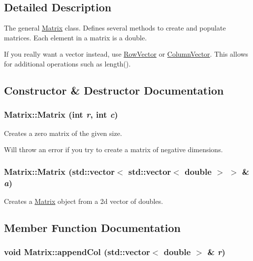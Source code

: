 \subsection{Detailed Description}
The general \hyperlink{class_matrix}{Matrix} class. Defines several methods to create and populate matrices. Each element in a matrix is a double.

If you really want a vector instead, use \hyperlink{class_row_vector}{RowVector} or \hyperlink{class_column_vector}{ColumnVector}. This allows for additional operations such as length(). 

\subsection{Constructor \& Destructor Documentation}
\hypertarget{class_matrix_a07a3cee5bc286ca27ceffe81ce5a2d01}{
\subsubsection[{Matrix}]{\setlength{\rightskip}{0pt plus 5cm}Matrix::Matrix (int {\em r}, \/  int {\em c})}}
\label{class_matrix_a07a3cee5bc286ca27ceffe81ce5a2d01}


Creates a zero matrix of the given size. 

Will throw an error if you try to create a matrix of negative dimensions. \hypertarget{class_matrix_a0db283ef4ea2660f8d0c1b58f9e74f49}{
\subsubsection[{Matrix}]{\setlength{\rightskip}{0pt plus 5cm}Matrix::Matrix (std::vector$<$ std::vector$<$ double $>$ $>$ \& {\em a})}}
\label{class_matrix_a0db283ef4ea2660f8d0c1b58f9e74f49}


Creates a \hyperlink{class_matrix}{Matrix} object from a 2d vector of doubles. 



\subsection{Member Function Documentation}
\hypertarget{class_matrix_a726f7ae83284c090af821752628974af}{
\subsubsection[{appendCol}]{\setlength{\rightskip}{0pt plus 5cm}void Matrix::appendCol (std::vector$<$ double $>$ \& {\em r})}}
\label{class_matrix_a726f7ae83284c090af821752628974af}


